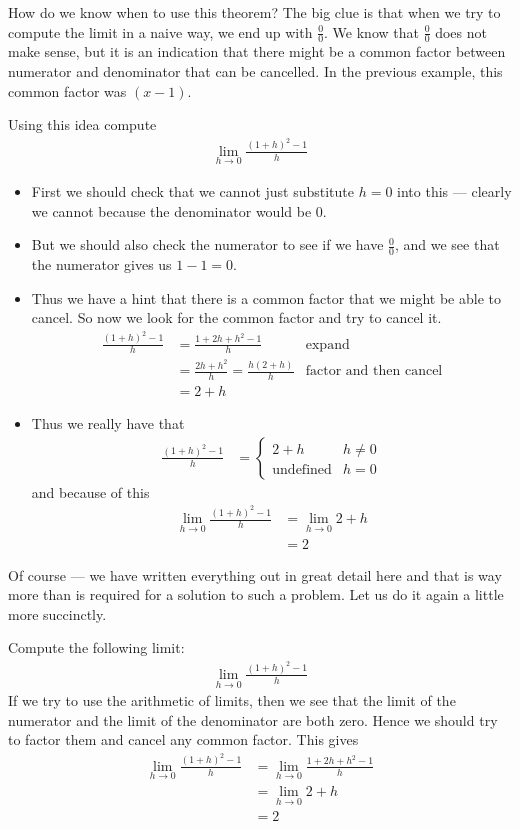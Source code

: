 How do we know when to use this theorem? The big clue is that when we try to
compute the limit in a naive way, we end up with $\frac{0}{0}$. We know that
$\frac{0}{0}$ does not make sense, but it is an indication that there might be a
common factor between numerator and denominator that can be cancelled. In the
previous example, this common factor was $(x-1)$.

\begin{eg}\label{eg easy 0on0 limit}
  Using this idea compute
 \begin{align*}
  \lim_{h \to 0} \frac{(1+h)^2-1}{h}
 \end{align*}

\begin{itemize}
 \item First we should check that we cannot just substitute $h=0$ into this ---
clearly we cannot because the denominator would be $0$.
\item But we should also check the numerator to see if we have $\frac{0}{0}$, and we see
that the numerator gives us $1-1 = 0$.
\item Thus we have a hint that there is a common factor that we might be able to
cancel. So now we look for the common factor and try to cancel it.
\begin{align*}
  \frac{(1+h)^2-1}{h} &= \frac{1+2h+h^2-1}{h} & \text{expand} \\
  &= \frac{2h+h^2}{h} = \frac{h(2+h)}{h} & \text{factor and then cancel}\\
  &= 2+h
\end{align*}
\item Thus we really have that
\begin{align*}
  \frac{(1+h)^2-1}{h}&= \begin{cases}
                         2+h & h \neq 0\\
			\text{undefined} & h=0
                        \end{cases}
\end{align*}
and because of this
\begin{align*}
  \lim_{h \to 0} \frac{(1+h)^2-1}{h}
  &= \lim_{h \to 0} 2+h \\
  &= 2
\end{align*}
\end{itemize}
\end{eg}
Of course --- we have written everything out in great detail here and
that is way more than is required for a solution to such a problem. Let us do
it again a little more succinctly.
\begin{eg}
 Compute the following limit:
 \begin{align*}
  \lim_{h \to 0} \frac{(1+h)^2-1}{h}
 \end{align*}
  If we try to use the arithmetic of limits, then we see that the limit of the
numerator and the limit of the denominator are both zero. Hence we should try
to factor them and cancel any common factor. This gives
 \begin{align*}
  \lim_{h \to 0} \frac{(1+h)^2-1}{h}
  &= \lim_{h \to 0} \frac{1+2h+h^2-1}{h} \\
  &= \lim_{h \to 0} 2+h \\
  &= 2
 \end{align*}
\end{eg}
